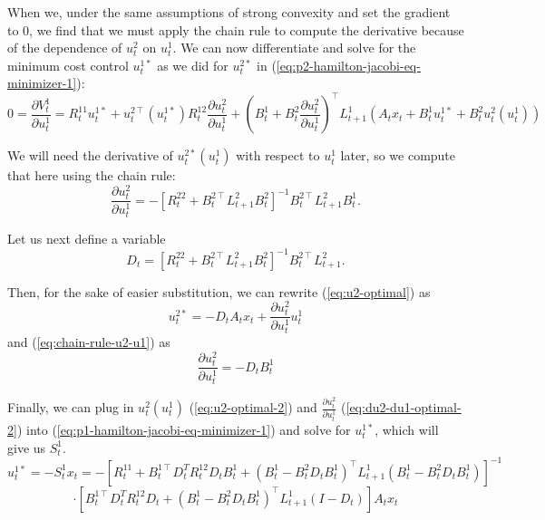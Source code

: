 \documentclass[11pt]{article}
\newcommand{\T}{\intercal}
\newcommand\dd[2]{\frac{\partial#1}{\partial#2}}
\begin{document}
When we, under the same assumptions of strong convexity and set the gradient to 0, we find that we must apply the chain rule to compute the derivative because of the dependence of $u^2_t$ on $u^1_t$. We can now differentiate and solve for the minimum cost control $u^{1*}_t$ as we did for $u^{2*}_t$ in (\ref{eq:p2-hamilton-jacobi-eq-minimizer-1}):
\begin{equation}
\label{eq:p1-hamilton-jacobi-eq-minimizer-1}
0 = \dd{V^{1}_t}{u^{1}_t} = R^{11}_t u^{1*}_t + u^{2\T}_t(u^{1*}_t) R^{12}_t \dd{u^{2}_t}{u^{1}_t} + \left(B^1_t + B^2_t \dd{u^{2}_t}{u^{1}_t} \right)^\T L^1_{t+1} \left( A_t x_t + B^1_t u^{1*}_t + B^2_t u^2_t(u^1_t) \right)
\end{equation}

We will need the derivative of $u^{2*}_t(u^1_t)$ with respect to $u^1_t$ later, so we compute that here using the chain rule:
\begin{equation}
\label{eq:chain-rule-u2-u1}
\dd{u^{2}_t}{u^{1}_t} = -\left[R^{22}_t + B^{2\T}_t L^2_{t+1} B^2_t\right]^{-1} B^{2\T}_t L^2_{t+1} B^1_t.
\end{equation}

Let us next define a variable
\begin{equation}
\label{eq:D-substitution}
D_t = \left[ R^{22}_t + B^{2\T}_t L^2_{t+1} B^2_t \right]^{-1} B^{2\T}_t L^2_{t+1}.
\end{equation}

Then, for the sake of easier substitution, we can rewrite (\ref{eq:u2-optimal}) as
\begin{equation}
\label{eq:u2-optimal-2}
u^{2*}_t = -D_t A_t x_t + \dd{u^2_t}{u^1_t} u^1_t
\end{equation}
and (\ref{eq:chain-rule-u2-u1}) as
\begin{equation}
\label{eq:du2-du1-optimal-2}
\dd{u^2_t}{u^1_t} = -D_tB^1_t
\end{equation}

Finally, we can plug in $u^2_t(u^1_t)$ (\ref{eq:u2-optimal-2}) and $\dd{u^{2}_t}{u^{1}_t}$ (\ref{eq:du2-du1-optimal-2}) into (\ref{eq:p1-hamilton-jacobi-eq-minimizer-1}) and solve for $u^{1*}_t$, which will give us $S^1_t$.
\begin{equation}
\label{eq:u1-optimal}
u^{1*}_t = -S^1_t x_t
    = -\left[ R^{11}_t 
             + B^{1\T}_t D_t^T R^{12}_t D_t B^1_t
             + \left( B^1_t - B^2_t D_t B^1_t \right)^\T
               L^1_{t+1}
               \left( B^1_t - B^2_t D_t B^1_t \right)
      \right]^{-1}
\end{equation}
\[
      \cdot \left[ B^{1\T}_t D_t^T R^{12}_t D_t
             + \left( B^1_t - B^2_t D_t B^1_t \right)^\T
               L^1_{t+1} \left(I - D_t\right) \right]
      A_t x_t
\]
\end{document}
